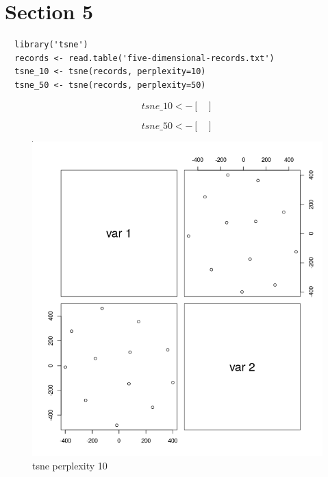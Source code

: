 \documentclass{report}
\begin{document}
\chapter{Section 5}

\begin{verbatim}	
  library('tsne')
  records <- read.table('five-dimensional-records.txt') 
  tsne_10 <- tsne(records, perplexity=10)
  tsne_50 <- tsne(records, perplexity=50)
\end{verbatim}

\[
  tsne\_10 <- 
  \begin{bmatrix}
  \end{bmatrix}
\]

\[
  tsne\_50 <- 
  \begin{bmatrix}
  \end{bmatrix}
\]

\begin{figure}[H]
  \includegraphics[width=\linewidth]{tsne_p_10.png}
  \caption{tsne perplexity 10}
  \label{fig:tsnep10}
\end{figure}
\end{document}

